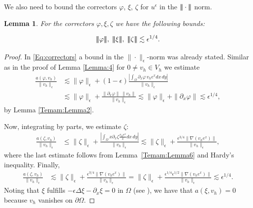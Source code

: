 \documentclass{article}
\newcommand{\vvvert}{\ensuremath|\!|\!|\xspace}
\newtheorem{lemma}[thm]{Lemma}
\newcommand{\ueps}{u^\epsilon}
\newcommand{\intO}{\int_\Omega}
\begin{document}
We also need to bound the correctors $\varphi$, $\xi$, $\zeta$ for $\ueps$ in the $\vvvert \cdot \vvvert $ norm.

\begin{lemma}\label{Lemma:5}
For the correctors $\varphi, \xi, \zeta$ we have the following bounds:

$$
\vvvert  \varphi\vvvert , \; \vvvert \xi\vvvert ,\; \vvvert \zeta\vvvert  \lesssim \epsilon^{1/4}.
$$
\end{lemma}

\begin{proof}
In \eqref{Eq:correctors} a bound in the $\|\cdot\|_\epsilon$-norm was already stated. Similar as in the proof of
Lemma \ref{Lemma:4} for $0\not= v_h\in V_h$ we estimate
$$
\begin{aligned}
\frac{a(\varphi,v_h)}{\|v_h\|_\epsilon} &\lesssim \|\varphi\|_\epsilon
        + (1-\epsilon)\frac{|\intO \partial_x \varphi \,v_h e^xdx\,dy|}{\|v_h\|_\epsilon} \\
   &\lesssim \|\varphi\|_\epsilon  + \frac{\|\partial_x \varphi\|\,\|v_h\|}{\|v_h\|_\epsilon} 
   \lesssim \|\varphi\|_\epsilon  + \|\partial_x \varphi\| \lesssim \epsilon^{1/4},
\end{aligned}
$$
by Lemma \ref{Temam:Lemma2}.

Now, integrating by parts, we estimate $\zeta$:
$$
\begin{aligned}
\frac{a(\zeta,v_h)}{\|v_h\|_\epsilon} 
&\leq 
\|\zeta\|_\epsilon + \frac{|\intO x \partial_x \zeta \frac{v_h e^x}{x}dx\,dy|}{\|v_h\|_\epsilon} 
\lesssim \|\zeta\|_\epsilon + \frac{\epsilon^{3/4} \|\nabla(v_he^x)\|}{\|v_h\|_\epsilon},
\end{aligned}
$$
where the last estimate follows from Lemma~\ref{Temam:Lemma6} and Hardy's inequality.
Finally,
$$
\begin{aligned}
\frac{a(\zeta,v_h)}{\|v_h\|_\epsilon} 
        &\lesssim \|\zeta\|_\epsilon + \frac{\epsilon^{3/4} \|\nabla(v_he^x)\|}{\|v_h\|_\epsilon}
        = \|\zeta\|_\epsilon + \frac{\epsilon^{1/4} \epsilon^{1/2}\|\nabla(v_he^x)\|}{\|v_h\|_\epsilon} 
              \lesssim \epsilon^{1/4}.
\end{aligned}
$$
Noting that $\xi$ fulfills $-\epsilon \Delta \xi - \partial_x \xi =0$ in $\Omega$ (see \cite[Eq. 34]{GieEtAl:13}), we have that
$
a(\xi,v_h) = 0
$
because $v_h$ vanishes on $\partial\Omega$.
\end{proof}
\end{document}
